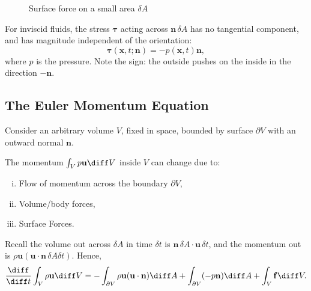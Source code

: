\documentclass[12pt]{article}
\begin{document}
\begin{figure}[h]
	\centering
	\caption{Surface force on a small area $\delta A$}
	\label{fig:surface_force}
\end{figure}

For inviscid fluids, the stress $\bm{\tau}$ acting across $\mathbf{n} \, \delta A$ has no tangential component, and has magnitude independent of the orientation:
\[
\bm{\tau}(\mathbf{x},t;\mathbf{n}) = - p(\mathbf{x},t)\mathbf{n}
,\]
where $p$ is the pressure. Note the sign: the outside pushes on the inside in the direction $- \mathbf{n}$.

\subsection{The Euler Momentum Equation}
\label{sub:the_euler_momentum_equation}

Consider an arbitrary volume $V$, fixed in space, bounded by surface $\partial V$ with an outward normal $\mathbf{n}$.

The momentum $\int_{V} p \mathbf{u}\diff V$ inside $V$ can change due to:
\begin{enumerate}[(i)]
	\item Flow of momentum across the boundary $\partial V$,
	\item Volume/body forces,
	\item Surface Forces.
\end{enumerate}

Recall the volume out across $\delta A$ in time $\delta t$ is $\mathbf{n} \, \delta A \cdot \mathbf{u} \, \delta t$, and the momentum out is $\rho \mathbf{u} (\mathbf{u} \cdot \mathbf{n} \, \delta A \delta t)$. Hence,
\[
\frac{\diff}{\diff t} \int_{V} \rho \mathbf{u} \diff V = - \int_{\partial V} \rho \mathbf{u}(\mathbf{u} \cdot \mathbf{n}) \diff A + \int_{\partial V} (- p \mathbf{n}) \diff A + \int_{V} \mathbf{f} \diff V
.\]
\end{document}
